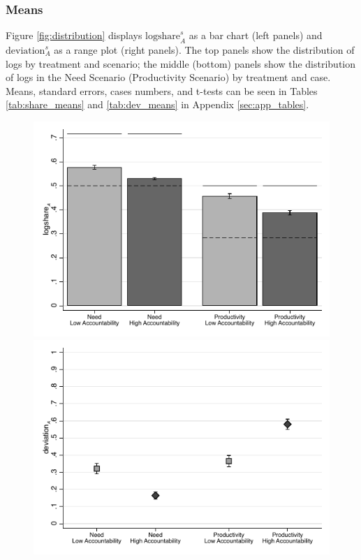 \documentclass[smallcondensed]{svjour3}
\begin{document}
\subsubsection*{Means}
%
Figure \ref{fig:distribution} displays $\mbox{logshare}_A^s$ as a bar chart (left panels) and $\mbox{deviation}_A^s$ as a range plot (right panels). The top panels show the distribution of logs by treatment and scenario; the middle (bottom) panels show the distribution of logs in the Need Scenario (Productivity Scenario) by treatment and case. Means, standard errors, cases numbers, and t-tests can be seen in Tables \ref{tab:share_means} and \ref{tab:dev_means} in Appendix \ref{sec:app_tables}.\par
%
\begin{figure}[ht!]
   \centering
   \includegraphics[scale=0.4]{figures/main_mean_share.pdf}\includegraphics[scale=0.4]{figures/main_mean_deviation.pdf}

\end{figure}
\end{document}
